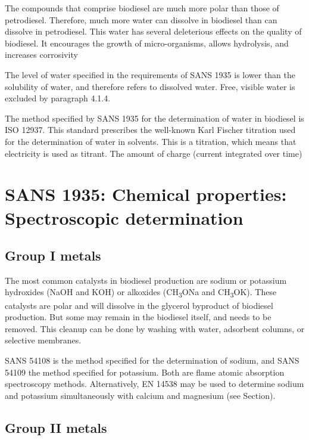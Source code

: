 The compounds that comprise biodiesel are much more polar than those of
petrodiesel. Therefore, much more water can dissolve in biodiesel than can
dissolve in petrodiesel. This water has several deleterious effects on the
quality of biodiesel. It encourages the growth of micro-organisms, allows
hydrolysis, and increases corrosivity

The level of water specified in the requirements of SANS 1935 is lower than the
solubility of water, and therefore refers to dissolved water. Free, visible
water is excluded by paragraph 4.1.4.

The method specified by SANS 1935 for the determination of water in biodiesel is
ISO 12937. This standard prescribes the well-known Karl Fischer titration used
for the determination of water in solvents. This is a 
titration, which means that electricity is used as titrant. The amount of charge
(current integrated over time)



\section{SANS 1935: Chemical properties: Spectroscopic determination}

\subsection{Group I metals}

The most common catalysts in biodiesel production are sodium or potassium
hydroxides (NaOH and KOH) or alkoxides (CH\textsubscript{3}ONa and
CH\textsubscript{3}OK). These catalysts are polar and will dissolve in the
glycerol byproduct of biodiesel production. But some may remain in the biodiesel
itself, and needs to be removed. This cleanup can be done by washing with water,
adsorbent columns, or selective membranes.

SANS 54108 is the method specified for the determination of sodium, and SANS
54109 the method specified for potassium. Both are flame atomic absorption
spectroscopy methods. Alternatively, EN 14538 may be used to determine sodium
and potassium simultaneously with calcium and magnesium (see
Section\label{sec:GroupIIMetals}).

\subsection{Group II metals}
\label{sec:GroupIIMetals}


